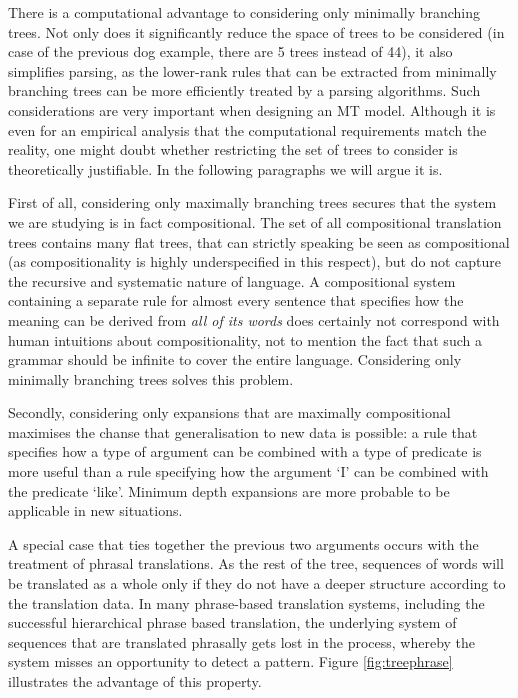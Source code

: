\documentclass{report}
\begin{document}
There is a computational advantage to considering only minimally branching trees. Not only does it significantly reduce the space of trees to be considered (in case of the previous dog example, there are 5 trees instead of 44), it also simplifies parsing, as the lower-rank rules that can be extracted from minimally branching trees can be more efficiently treated by a parsing algorithms. Such considerations are very important when designing an MT model. Although it is even for an empirical analysis that the computational requirements match the reality, one might doubt whether restricting the set of trees to consider is theoretically justifiable. In the following paragraphs we will argue it is.

First of all, considering only maximally branching trees secures that the system we are studying is in fact compositional. The set of all compositional translation trees contains many flat trees, that can strictly speaking be seen as compositional (as compositionality is highly underspecified in this respect), but do not capture the recursive and systematic nature of language. A compositional system containing a separate rule for almost every sentence that specifies how the meaning can be derived from \textit{all of its words} does certainly not correspond with human intuitions about compositionality, not to mention the fact that such a grammar should be infinite to cover the entire language. Considering only minimally branching trees solves this problem.

Secondly, considering only expansions that are maximally compositional maximises the chanse that generalisation to new data is possible: a rule that specifies how a type of argument can be combined with a type of predicate is more useful than a rule specifying how the argument `I' can be combined with the predicate `like'. Minimum depth expansions are more probable to be applicable in new situations.

A special case that ties together the previous two arguments occurs with the treatment of phrasal translations. As the rest of the tree, sequences of words will be translated as a whole only if they do not have a deeper structure according to the translation data. In many phrase-based translation systems, including the successful hierarchical phrase based translation, the underlying system of sequences that are translated phrasally gets lost in the process, whereby the system misses an opportunity to detect a pattern. Figure \ref{fig:treephrase} illustrates the advantage of this property.
\end{document}

